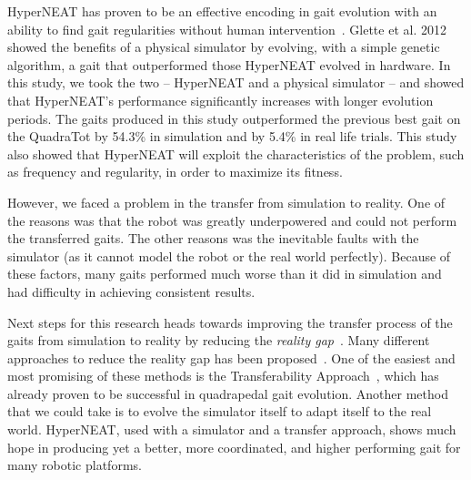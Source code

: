 HyperNEAT has proven to be an effective encoding in gait evolution with an ability to find gait regularities without human intervention~\cite{clune2009evolving,clune2011performance,yos:clune}. Glette et al. 2012~\cite{glette} showed the benefits of a physical simulator by evolving, with a simple genetic algorithm, a gait that outperformed those HyperNEAT evolved in hardware.
In this study, we took the two -- HyperNEAT and a physical simulator -- and showed that HyperNEAT's performance significantly increases with longer evolution periods. The gaits produced in this study outperformed the previous best gait on the QuadraTot by 54.3\% in simulation and by 5.4\% in real life trials. This study also showed that HyperNEAT will exploit the characteristics of the problem, such as frequency and regularity, in order to maximize its fitness.


However, we faced a problem in the transfer from simulation to reality. %
One of the reasons was that the robot was greatly underpowered and could not perform the transferred gaits. The other reasons was the inevitable faults with the simulator (as it cannot model the robot or the real world perfectly). Because of these factors, many gaits performed much worse than it did in simulation and had difficulty in achieving consistent results. 


Next steps for this research heads towards improving the transfer process of the gaits from simulation to reality by reducing the \emph{reality gap}~\cite{jakobi}. Many different approaches to reduce the reality gap has been proposed~\cite{koos2010crossing,bongard,zagal}. One of the easiest and most promising of these methods is the Transferability Approach~\cite{koos2011transferability}, which has already proven to be successful in quadrapedal gait evolution. Another method that we could take is to evolve the simulator itself to adapt itself to the real world. HyperNEAT, used with a simulator and a transfer approach, shows much hope in producing yet a better, more coordinated, and higher performing gait for many robotic platforms.
